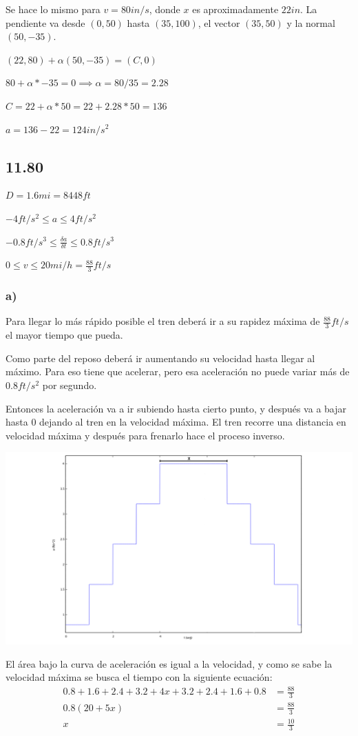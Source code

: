 \documentclass[12pt]{article}
\begin{document}
Se hace lo mismo para $v=80in/s$, donde $x$ es aproximadamente $22in$. La pendiente va desde $(0,50)$ hasta $(35,100)$, el vector $(35,50)$ y la normal $(50,-35)$.

$(22,80)+\alpha(50,-35)=(C,0)$

$80+\alpha*-35=0 \implies \alpha=80/35=2.28$

$C=22+\alpha*50=22+2.28*50=136$

$a=136-22=124in/s^2$
\subsection*{11.80}
$D=1.6mi=8448ft$

$-4ft/s^2\le a\le 4ft/s^2$

$-0.8ft/s^3\le \frac{\delta a}{\delta t}\le 0.8ft/s^3$

$0\le v\le 20mi/h=\frac{88}{3}ft/s$
\subsubsection*{a)}
Para llegar lo más rápido posible el tren deberá ir a su rapidez máxima de $\frac{88}{3}ft/s$ el mayor tiempo que pueda.

Como parte del reposo deberá ir aumentando su velocidad hasta llegar al máximo. Para eso tiene que acelerar, pero esa aceleración no puede variar más de $0.8ft/s^2$ por segundo.

Entonces la aceleración va a ir subiendo hasta cierto punto, y después va a bajar hasta 0 dejando al tren en la velocidad máxima. El tren recorre una distancia en velocidad máxima y después para frenarlo hace el proceso inverso.

\includegraphics[width=\linewidth]{1180a}

El área bajo la curva de aceleración es igual a la velocidad, y como se sabe la velocidad máxima se busca el tiempo con la siguiente ecuación:
\begin{align*}
  0.8+1.6+2.4+3.2+4x+3.2+2.4+1.6+0.8&=\frac{88}{3}\\
  0.8(20+5x)&=\frac{88}{3}\\
  x&=\frac{10}{3}
\end{align*}
\end{document}
